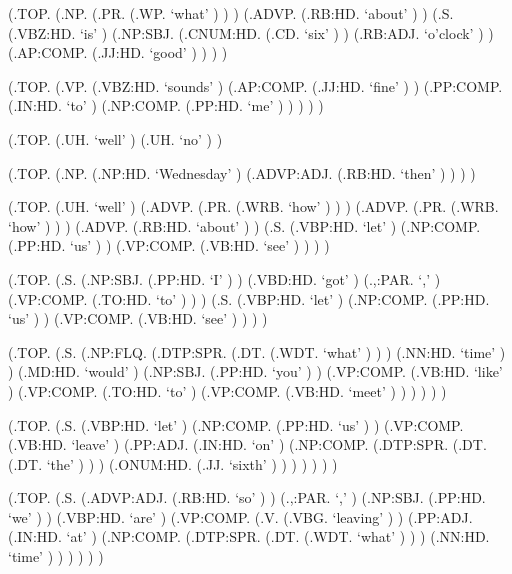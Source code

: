 \documentclass[10pt]{article}
\begin{document}
\begin{parsetree}  (.TOP. (.NP. (.PR. (.WP. `what' ) ) ) (.ADVP. (.RB:HD. `about' ) ) (.S. (.VBZ:HD. `is' ) (.NP:SBJ. (.CNUM:HD. (.CD. `six' ) ) (.RB:ADJ. `o'clock' ) ) (.AP:COMP. (.JJ:HD. `good' ) ) ) ) \end{parsetree}

\begin{parsetree}  (.TOP. (.VP. (.VBZ:HD. `sounds' ) (.AP:COMP. (.JJ:HD. `fine' ) ) (.PP:COMP. (.IN:HD. `to' ) (.NP:COMP. (.PP:HD. `me' ) ) ) ) ) \end{parsetree}

\begin{parsetree}  (.TOP. (.UH. `well' ) (.UH. `no' ) ) \end{parsetree}

\begin{parsetree}  (.TOP. (.NP. (.NP:HD. `Wednesday' ) (.ADVP:ADJ. (.RB:HD. `then' ) ) ) ) \end{parsetree}

\begin{parsetree}  (.TOP. (.UH. `well' ) (.ADVP. (.PR. (.WRB. `how' ) ) ) (.ADVP. (.PR. (.WRB. `how' ) ) ) (.ADVP. (.RB:HD. `about' ) ) (.S. (.VBP:HD. `let' ) (.NP:COMP. (.PP:HD. `us' ) ) (.VP:COMP. (.VB:HD. `see' ) ) ) ) \end{parsetree}

\begin{parsetree}  (.TOP. (.S. (.NP:SBJ. (.PP:HD. `I' ) ) (.VBD:HD. `got' ) (.,:PAR. `,' ) (.VP:COMP. (.TO:HD. `to' ) ) ) (.S. (.VBP:HD. `let' ) (.NP:COMP. (.PP:HD. `us' ) ) (.VP:COMP. (.VB:HD. `see' ) ) ) ) \end{parsetree}

\begin{parsetree}  (.TOP. (.S. (.NP:FLQ. (.DTP:SPR. (.DT. (.WDT. `what' ) ) ) (.NN:HD. `time' ) ) (.MD:HD. `would' ) (.NP:SBJ. (.PP:HD. `you' ) ) (.VP:COMP. (.VB:HD. `like' ) (.VP:COMP. (.TO:HD. `to' ) (.VP:COMP. (.VB:HD. `meet' ) ) ) ) ) ) \end{parsetree}

\begin{parsetree}  (.TOP. (.S. (.VBP:HD. `let' ) (.NP:COMP. (.PP:HD. `us' ) ) (.VP:COMP. (.VB:HD. `leave' ) (.PP:ADJ. (.IN:HD. `on' ) (.NP:COMP. (.DTP:SPR. (.DT. (.DT. `the' ) ) ) (.ONUM:HD. (.JJ. `sixth' ) ) ) ) ) ) ) \end{parsetree}

\begin{parsetree}  (.TOP. (.S. (.ADVP:ADJ. (.RB:HD. `so' ) ) (.,:PAR. `,' ) (.NP:SBJ. (.PP:HD. `we' ) ) (.VBP:HD. `are' ) (.VP:COMP. (.V. (.VBG. `leaving' ) ) (.PP:ADJ. (.IN:HD. `at' ) (.NP:COMP. (.DTP:SPR. (.DT. (.WDT. `what' ) ) ) (.NN:HD. `time' ) ) ) ) ) ) \end{parsetree}
\end{document}
